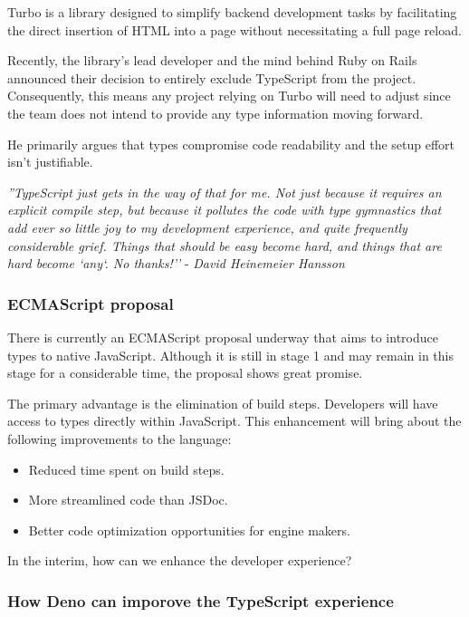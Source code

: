 \documentclass[10pt,journal,compsoc]{IEEEtran}
\begin{document}
Turbo is a library designed to simplify backend development tasks by facilitating the direct insertion of HTML into a page without necessitating a full page reload.

Recently, the library's lead developer and the mind behind Ruby on Rails announced their decision to entirely exclude TypeScript from the project. Consequently, this means any project relying on Turbo will need to adjust since the team does not intend to provide any type information moving forward.

He primarily argues that types compromise code readability and the setup effort isn't justifiable.

\textit{''TypeScript just gets in the way of that for me. Not just because it requires an explicit compile step, but because it pollutes the code with type gymnastics that add ever so little joy to my development experience, and quite frequently considerable grief. Things that should be easy become hard, and things that are hard become `any`. No thanks!''} - \textit{David Heinemeier Hansson} \cite{TurboTS}

\subsubsection{ECMAScript proposal}

There is currently an ECMAScript proposal underway that aims to introduce types to native JavaScript. Although it is still in stage 1 and may remain in this stage for a considerable time, the proposal shows great promise.

The primary advantage is the elimination of build steps. Developers will have access to types directly within JavaScript. This enhancement will bring about the following improvements to the language:

\begin{itemize}
    \item Reduced time spent on build steps.
    \item More streamlined code than JSDoc.
    \item Better code optimization opportunities for engine makers.
\end{itemize}

In the interim, how can we enhance the developer experience?

\subsubsection{How Deno can imporove the TypeScript experience}
\end{document}
